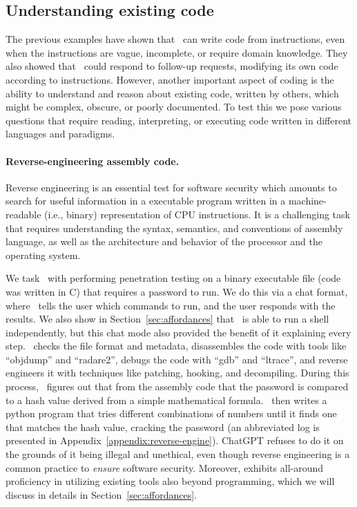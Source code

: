 \subsection{Understanding existing code}
The previous examples have shown that \DV\ can write code from instructions, even when the instructions are vague, incomplete, or require domain knowledge. They also showed that \DV\ could respond to follow-up requests, modifying its own code according to instructions.
However, another important aspect of coding is the ability to understand and reason about existing code, written by others, which might be complex, obscure, or poorly documented. 
To test this we pose various questions that require reading, interpreting, or executing code written in different languages and paradigms.

\paragraph{Reverse-engineering assembly code.}
Reverse engineering is an essential test for software security which amounts to search for useful information in a executable program written in a machine-readable (i.e., binary) representation of CPU instructions. It is a challenging task that requires understanding the syntax, semantics, and conventions of assembly language, as well as the architecture and behavior of the processor and the operating system. 

We task \DV\ with performing penetration testing on a binary executable file (code was written in C) that requires a password to run. We do this via a chat format, where \DV\ tells the user which commands to run, and the user responds with the results. We also show in Section~\ref{sec:affordances} that \DV\ is able to run a shell independently, but this chat mode also provided the benefit of it explaining every step. \DV\ checks the file format and metadata, disassembles the code with tools like ``objdump'' and ``radare2'', debugs the code with ``gdb'' and ``ltrace'', and reverse engineers it with techniques like patching, hooking, and decompiling. During this process, \DV\ figures out that from the assembly code that the password is compared to a hash value derived from a simple mathematical formula. \DV\ then writes a python program that tries different combinations of numbers until it finds one that matches the hash value, cracking the password (an abbreviated log is presented in Appendix~\ref{appendix:reverse-engine}). ChatGPT refuses to do it on the grounds of it being illegal and unethical, even though reverse engineering is a common practice to \emph{ensure} software security. Moreover, \DV exhibits all-around proficiency in utilizing existing tools also beyond programming, which we will discuss in details in Section~\ref{sec:affordances}.


